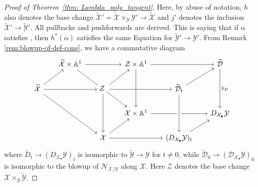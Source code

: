 \documentclass[12pt]{amsart}
\newcommand{\cD}{\mathcal{D}}
\newcommand{\cX}{\mathcal{X}}
\newcommand{\cY}{\mathcal{Y}}
\newcommand{\cZ}{\mathcal{Z}}
\newcommand{\tcY}{\widetilde{\mathcal{Y}}}
\newcommand{\tcX}{\widetilde{\mathcal{X}}}
\theoremstyle{definition}
\begin{document}
\begin{proof}[Proof of Theorem~\ref{thm: Lambda_poly_tangent}]
Here, by abuse of notation, $h$ also denotes the base change $\widetilde{\cX}'=\widetilde{\cX} \times_{\cY} \cY' \to \widetilde{\cX}$ and $j'$ denotes the inclusion $\tcX' \to \tcY'$. All pullbacks and pushforwards are derived. This is saying that if $\alpha$ satisfies , then $h^*(\alpha)$ satisfies the same Equation for $\widetilde{\cY}' \to \cY'$.
From Remark \ref{rem:blowup-of-def-cone}, we have a commutative diagram
\[
\begin{tikzcd}[sep=.6cm]
& \widetilde{\cX}\times\mathbb{A}^1
    \arrow[rr]
    \arrow[ddrr, "\textstyle \cZ" description]
&& \cZ\times\mathbb{A}^1
    \arrow[rr]
    \arrow[dd]
&& \widetilde{\cD}
    \arrow[dd, "b_D"]
\\
\widetilde{\cX}
    \arrow[rr]
    \arrow[ddrr]
    \arrow[ur]
&& \cZ
    \arrow[rr]
    \arrow[dd]
    \arrow[ru]
&& \widetilde{\cD}_t
    \arrow[ru]
\\
&&&
\cX \times\mathbb{A}^1
    \arrow[rr]
&& D_{\cX_\bullet}\cY
\\
&&
\cX
    \arrow[rr]
    \arrow[ru]
&& (D_{\cX_\bullet}\cY)_t
    \arrow[ru]
    \arrow[from=uu, crossing over]
\end{tikzcd}
\]
where
$
\widetilde{D}_t \longrightarrow (D_{\cX_\bullet}\cY)_t
$
is isomorphic to
$
\widetilde{\cY} \longrightarrow \cY
$
for \(t\neq 0\), while
$\widetilde{\cD}_0 \longrightarrow (\cD_{\cX_\bullet}\cY)_0$ is isomorphic to the blowup of $\mathcal{N}_{\cX/\cY}
$ along $\cX$. Here $\cZ$ denotes the base change $\cX\times_{\cY} \widetilde{\cY}$. 



\end{proof}
\end{document}
